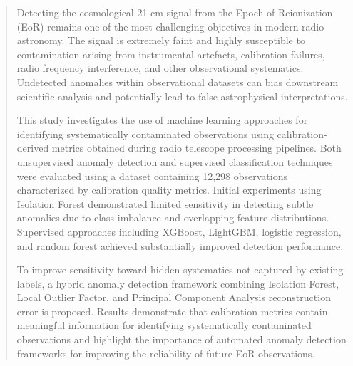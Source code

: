 \documentclass[linenumbers,trackchanges]{aastex701}
\begin{document}
\author[0000-0003-1183-9293]{Ridhima Nunhokee}


\begin{abstract}

Detecting the cosmological 21 cm signal from the Epoch of Reionization (EoR) remains one of the most challenging objectives in modern radio astronomy. The signal is extremely faint and highly susceptible to contamination arising from instrumental artefacts, calibration failures, radio frequency interference, and other observational systematics. Undetected anomalies within observational datasets can bias downstream scientific analysis and potentially lead to false astrophysical interpretations.

This study investigates the use of machine learning approaches for identifying systematically contaminated observations using calibration-derived metrics obtained during radio telescope processing pipelines. Both unsupervised anomaly detection and supervised classification techniques were evaluated using a dataset containing 12,298 observations characterized by calibration quality metrics. Initial experiments using Isolation Forest demonstrated limited sensitivity in detecting subtle anomalies due to class imbalance and overlapping feature distributions. Supervised approaches including XGBoost, LightGBM, logistic regression, and random forest achieved substantially improved detection performance.

To improve sensitivity toward hidden systematics not captured by existing labels, a hybrid anomaly detection framework combining Isolation Forest, Local Outlier Factor, and Principal Component Analysis reconstruction error is proposed. Results demonstrate that calibration metrics contain meaningful information for identifying systematically contaminated observations and highlight the importance of automated anomaly detection frameworks for improving the reliability of future EoR observations.

\end{abstract}
\end{document}
